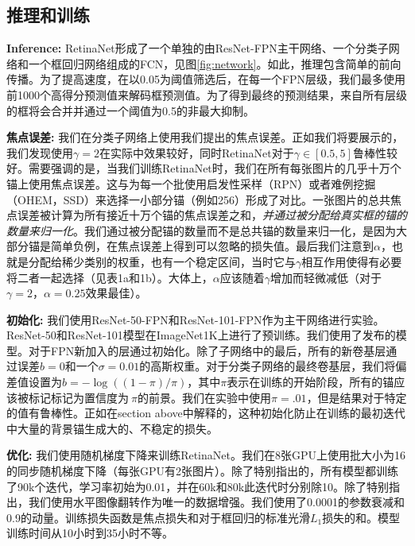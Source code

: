 \documentclass{ctexart}
\begin{document}
\subsection{推理和训练}
\textbf{Inference:} RetinaNet形成了一个单独的由ResNet-FPN主干网络、一个分类子网络和一个框回归网络组成的FCN，见图\ref{fig:network}。如此，推理包含简单的前向传播。为了提高速度，在以0.05为阈值筛选后，在每一个FPN层级，我们最多使用前1000个高得分预测值来解码框预测值。为了得到最终的预测结果，来自所有层级的框将会合并并通过一个阈值为0.5的非最大抑制。\par
\textbf{焦点误差:} 我们在分类子网络上使用我们提出的焦点误差。正如我们将要展示的，我们发现使用$\gamma = 2$在实际中效果较好，同时RetinaNet对于$\gamma \in [0.5, 5]$鲁棒性较好。需要强调的是，当我们训练RetinaNet时，我们在所有每张图片的几乎十万个锚上使用焦点误差。这与为每一个批使用启发性采样（RPN）或者难例挖掘（OHEM，SSD）来选择一小部分锚（例如256）形成了对比。一张图片的总共焦点误差被计算为所有接近十万个锚的焦点误差之和，\textit{并通过被分配给真实框的锚的数量来归一化}。我们通过被分配锚的数量而不是总共锚的数量来归一化，是因为大部分锚是简单负例，在焦点误差上得到可以忽略的损失值。最后我们注意到$\alpha$，也就是分配给稀少类别的权重，也有一个稳定区间，当时它与$\gamma$相互作用使得有必要将二者一起选择（见表1a和1b）。大体上，$\alpha$应该随着$\gamma$增加而轻微减低（对于$\gamma=2$，$\alpha=0.25$效果最佳）。\par
\textbf{初始化:} 我们使用ResNet-50-FPN和ResNet-101-FPN作为主干网络进行实验。ResNet-50和ResNet-101模型在ImageNet1K上进行了预训练。我们使用了\cite{resnet}发布的模型。对于FPN新加入的层通过\cite{fpn}初始化。除了子网络中的最后，所有的新卷基层通过误差$b=0$和一个$\sigma=0.01$的高斯权重。对于分类子网络的最终卷基层，我们将偏差值设置为$b=-\log((1-\pi)/\pi)$，其中$\pi$表示在训练的开始阶段，所有的锚应该被标记标记为置信度为$~\pi$的前景。我们在实验中使用$\pi=.01$，但是结果对于特定的值有鲁棒性。正如在section above中解释的，这种初始化防止在训练的最初迭代中大量的背景锚生成大的、不稳定的损失。\par
\textbf{优化:} 我们使用随机梯度下降来训练RetinaNet。我们在8张GPU上使用批大小为16的同步随机梯度下降（每张GPU有2张图片）。除了特别指出的，所有模型都训练了90k个迭代，学习率初始为0.01，并在60k和80k此迭代时分别除10。除了特别指出，我们使用水平图像翻转作为唯一的数据增强。我们使用了0.0001的参数衰减和0.9的动量。训练损失函数是焦点损失和对于框回归的标准光滑$L_1$损失的和。模型训练时间从10小时到35小时不等。

\printbibliography
\end{document}
